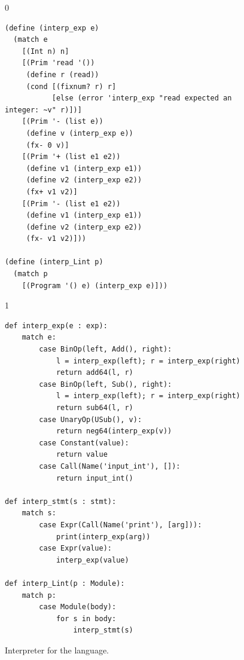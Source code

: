 \documentclass[7x10]{TimesAPriori_MIT}%
\def\racketEd{0}
\def\pythonEd{1}
\def\edition{1}
\newcommand{\pythonColor}[0]{}
\numberwithin{theorem}{chapter}
\numberwithin{definition}{chapter}
\numberwithin{equation}{chapter}
\begin{document}
\begin{figure}[tp]
\begin{tcolorbox}[colback=white]
{\if\edition\racketEd
\begin{lstlisting}
(define (interp_exp e)
  (match e
    [(Int n) n]
    [(Prim 'read '())
     (define r (read))
     (cond [(fixnum? r) r]
           [else (error 'interp_exp "read expected an integer: ~v" r)])]
    [(Prim '- (list e))
     (define v (interp_exp e))
     (fx- 0 v)]
    [(Prim '+ (list e1 e2))
     (define v1 (interp_exp e1))
     (define v2 (interp_exp e2))
     (fx+ v1 v2)]
    [(Prim '- (list e1 e2))
     (define v1 (interp_exp e1))
     (define v2 (interp_exp e2))
     (fx- v1 v2)]))

(define (interp_Lint p)
  (match p
    [(Program '() e) (interp_exp e)]))
\end{lstlisting}
\fi}
{\if\edition\pythonEd\pythonColor
\begin{lstlisting}
def interp_exp(e : exp):
    match e:
        case BinOp(left, Add(), right):
            l = interp_exp(left); r = interp_exp(right)
            return add64(l, r)
        case BinOp(left, Sub(), right):
            l = interp_exp(left); r = interp_exp(right)
            return sub64(l, r)
        case UnaryOp(USub(), v):
            return neg64(interp_exp(v))
        case Constant(value):
            return value
        case Call(Name('input_int'), []):
            return input_int()

def interp_stmt(s : stmt):
    match s:
        case Expr(Call(Name('print'), [arg])):
            print(interp_exp(arg))
        case Expr(value):
            interp_exp(value)

def interp_Lint(p : Module):
    match p:
        case Module(body):
            for s in body:
                interp_stmt(s)
\end{lstlisting}
\fi}
\end{tcolorbox}

\caption{Interpreter for the \LangInt{} language.}
\label{fig:interp_Lint}
\end{figure}
\end{document}
